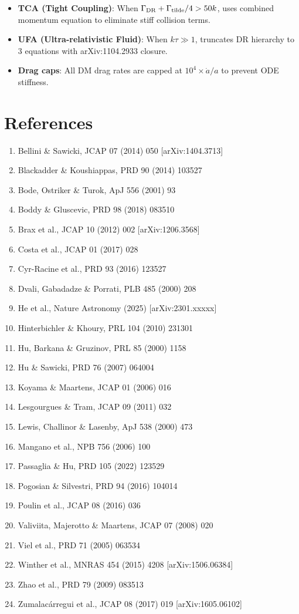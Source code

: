 \documentclass[11pt,a4paper]{article}
\begin{document}
\begin{itemize}[nosep]
    \item \textbf{TCA (Tight Coupling)}: When $\Gamma_{\rm DR} + \Gamma_{\rm tilde}/4 > 50k$, uses combined momentum equation to eliminate stiff collision terms.
    \item \textbf{UFA (Ultra-relativistic Fluid)}: When $k\tau \gg 1$, truncates DR hierarchy to 3 equations with arXiv:1104.2933 closure.
    \item \textbf{Drag caps}: All DM drag rates are capped at $10^4 \times \dot{a}/a$ to prevent ODE stiffness.
\end{itemize}


\section{References}

\begin{enumerate}[nosep]
    \item Bellini \& Sawicki, JCAP 07 (2014) 050 [arXiv:1404.3713]
    \item Blackadder \& Koushiappas, PRD 90 (2014) 103527
    \item Bode, Ostriker \& Turok, ApJ 556 (2001) 93
    \item Boddy \& Gluscevic, PRD 98 (2018) 083510
    \item Brax et al., JCAP 10 (2012) 002 [arXiv:1206.3568]
    \item Costa et al., JCAP 01 (2017) 028
    \item Cyr-Racine et al., PRD 93 (2016) 123527
    \item Dvali, Gabadadze \& Porrati, PLB 485 (2000) 208
    \item He et al., Nature Astronomy (2025) [arXiv:2301.xxxxx]
    \item Hinterbichler \& Khoury, PRL 104 (2010) 231301
    \item Hu, Barkana \& Gruzinov, PRL 85 (2000) 1158
    \item Hu \& Sawicki, PRD 76 (2007) 064004
    \item Koyama \& Maartens, JCAP 01 (2006) 016
    \item Lesgourgues \& Tram, JCAP 09 (2011) 032
    \item Lewis, Challinor \& Lasenby, ApJ 538 (2000) 473
    \item Mangano et al., NPB 756 (2006) 100
    \item Passaglia \& Hu, PRD 105 (2022) 123529
    \item Pogosian \& Silvestri, PRD 94 (2016) 104014
    \item Poulin et al., JCAP 08 (2016) 036
    \item Valiviita, Majerotto \& Maartens, JCAP 07 (2008) 020
    \item Viel et al., PRD 71 (2005) 063534
    \item Winther et al., MNRAS 454 (2015) 4208 [arXiv:1506.06384]
    \item Zhao et al., PRD 79 (2009) 083513
    \item Zumalac\'arregui et al., JCAP 08 (2017) 019 [arXiv:1605.06102]
\end{enumerate}
\end{document}
